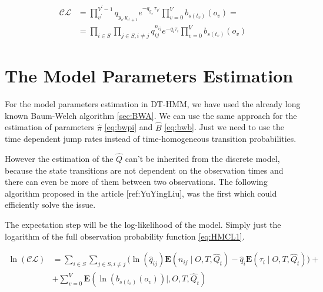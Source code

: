 \documentclass[thesis=M,english]{FITthesis}[2012/10/20]
\begin{document}
\begin{equation}\label{eq:HMCL1}
\begin{aligned}  
 \mathcal{CL} &= \prod_{v^{'}}^{V^{'}-1} q_{y_{v^{'}} y_{v^{'}+1}} e^{ - q_{y_{v^{'}}} \tau_{v^{'}} } 
    \prod_{v=0}^V b_{s(t_v)}(o_v) = \\
    &= \prod_{i \in S} \prod_{j \in S, i \neq j} q_{ij}^{n_{ij} } e^{ - q_i \tau_i } \prod_{v=0}^V b_{s(t_v)}(o_v)
\end{aligned}
\end{equation}



\section{The Model Parameters Estimation}


For the model parameters estimation in DT-HMM, we have used the already long known Baum-Welch algorithm \ref{sec:BWA}. We can use the same approach for the estimation of parameters $\hat \pi$ \eqref{eq:bwpi} and $\hat B$ \eqref{eq:bwb}. Just we need to use the time dependent jump rates instead of time-homogeneous transition probabilities. %

However the estimation of the $\hat Q$ can't be inherited from the discrete model, because the state transitions are not dependent on the observation times and there can even be more of them between two observations. The following algorithm proposed in the article [ref:YuYingLiu], was the first which could efficiently solve the issue.        

The expectation step will be the log-likelihood of the model. Simply just the logarithm of the full observation probability function \eqref{eq:HMCL1}.

\begin{equation}\label{eq:EMCTHMM}
\begin{aligned}  
 \ln(\mathcal{CL}) &= \sum_{i \in S} \sum_{j \in S, i \neq j} \big( \ln( \hat q_{ij}) \mathbf{E}( n_{ij} \mid O,T, \hat Q_t ) - \hat q_i \mathbf{E}( \tau_i \mid O,T, \hat Q_t ) \big) + \\
    &+ \sum_{v=0}^V \mathbf{E}( \ln( b_{s(t_v)}(o_v) ) \mid, O,T,\hat Q_t )
\end{aligned}
\end{equation}
\end{document}
